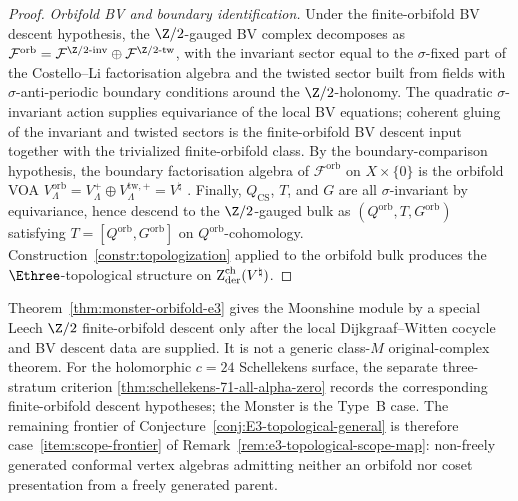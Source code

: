 \begin{proof}
\emph{Orbifold BV and boundary identification.}
Under the finite-orbifold BV descent hypothesis, the $\Z/2$-gauged BV
complex decomposes as
$\mathcal F^{\mathrm{orb}} =
\mathcal F^{\Z/2\text{-inv}} \oplus
\mathcal F^{\Z/2\text{-tw}}$, with the invariant sector
equal to the $\sigma$-fixed part of the Costello--Li
factorisation algebra and the twisted sector built from
fields with $\sigma$-anti-periodic boundary conditions
around the $\Z/2$-holonomy. The quadratic $\sigma$-invariant action
supplies equivariance of the local BV equations; coherent gluing of
the invariant and twisted sectors is the finite-orbifold BV descent
input together with the trivialized finite-orbifold class. By the
boundary-comparison hypothesis, the boundary factorisation algebra of
$\mathcal F^{\mathrm{orb}}$ on $X \times \{0\}$ is the orbifold VOA
$V_\Lambda^{\mathrm{orb}} = V_\Lambda^+ \oplus
V_\Lambda^{\mathrm{tw},+} = V^\natural$
\cite{Huang2015, DijkgraafVafaVerlindeVerlinde1989}.
Finally, $Q_{\mathrm{CS}}$, $T$, and $G$ are all
$\sigma$-invariant by equivariance, hence descend to the
$\Z/2$-gauged bulk as $(Q^{\mathrm{orb}}, T, G^{\mathrm{orb}})$
satisfying $T = [Q^{\mathrm{orb}}, G^{\mathrm{orb}}]$ on
$Q^{\mathrm{orb}}$-cohomology. Construction~\ref{constr:topologization}
applied to the orbifold bulk produces the
$\Ethree$-topological structure on
$\operatorname{Z}_{\mathrm{der}}^{\mathrm{ch}}(V^\natural)$.
\end{proof}

\begin{remark}
\label{rem:monster-orbifold-route}
Theorem~\ref{thm:monster-orbifold-e3} gives the Moonshine module by a
special Leech $\Z/2$ finite-orbifold descent only after the local
Dijkgraaf--Witten cocycle and BV descent data are supplied. It is not a
generic class-$M$ original-complex theorem. For the holomorphic $c=24$
Schellekens surface, the separate three-stratum criterion
\ref{thm:schellekens-71-all-alpha-zero} records the corresponding
finite-orbifold descent hypotheses; the Monster is the Type~B case. The
remaining frontier of
Conjecture~\ref{conj:E3-topological-general} is therefore
case~\ref{item:scope-frontier} of
Remark~\ref{rem:e3-topological-scope-map}: non-freely
generated conformal vertex algebras admitting neither an
orbifold nor coset presentation from a freely generated
parent.
\end{remark}

